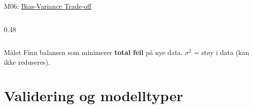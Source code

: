 \documentclass[aspectratio=169, 10pt]{beamer}
\begin{document}
\begin{frame}{M06: \href{https://en.wikipedia.org/wiki/Bias\%E2\%80\%93variance_tradeoff}{Bias-Variance Trade-off}}
\begin{columns}
\begin{column}{0.48\textwidth}
\begin{center}
            \end{center}
        \end{column}
    \end{columns}

    \begin{block}{\scriptsize Målet}
        \scriptsize Finn balansen som minimerer \textbf{total feil} på nye data. $\sigma^2$ = støy i data (kan ikke reduseres).
    \end{block}

\end{frame}

\section{Validering og modelltyper}
\end{document}
